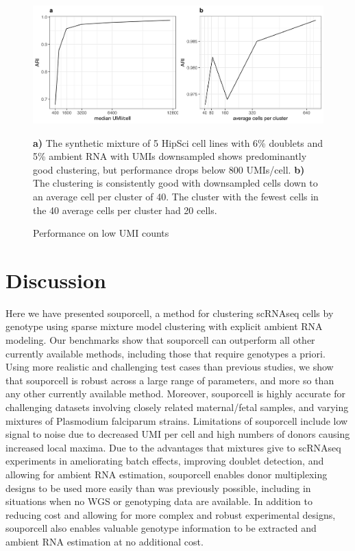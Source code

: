 \begin{figure}[htbp!]
\caption{Performance on low UMI counts}
\label{figure:umidown}
\begin{centering}

\includegraphics[width=\textwidth]{umidown.jpg} 
\par{\textbf{a)} The synthetic mixture of 5 HipSci cell lines with 6\% doublets and 5\% ambient RNA with UMIs downsampled shows predominantly
good clustering, but performance drops below 800 UMIs/cell. \textbf{b)} The clustering is consistently good with downsampled cells down to an
average cell per cluster of 40. The cluster with the fewest cells in the 40 average cells per cluster had 20 cells.}

\end{centering}
\end{figure}




\section{Discussion}
Here we have presented souporcell, a method for clustering scRNAseq cells by genotype using sparse mixture model clustering with explicit ambient RNA modeling. Our benchmarks show that souporcell can outperform all other currently available methods, including those that require genotypes a priori. Using more realistic and challenging test cases than previous studies, we show that souporcell is robust across a large range of parameters, and more so than any other currently available method. Moreover, souporcell is highly accurate for challenging datasets involving closely related maternal/fetal samples, and varying mixtures of Plasmodium falciparum strains. Limitations of souporcell include low signal to noise due to decreased UMI per cell and high numbers of donors causing increased local maxima. Due to the advantages that mixtures give to scRNAseq experiments in ameliorating batch effects, improving doublet detection, and allowing for ambient RNA estimation, souporcell enables donor multiplexing designs to be used more easily than was previously possible, including in situations when no WGS or genotyping data are available. In addition to reducing cost and allowing for more complex and robust experimental designs, souporcell also enables valuable genotype information to be extracted and ambient RNA estimation at no additional cost.


